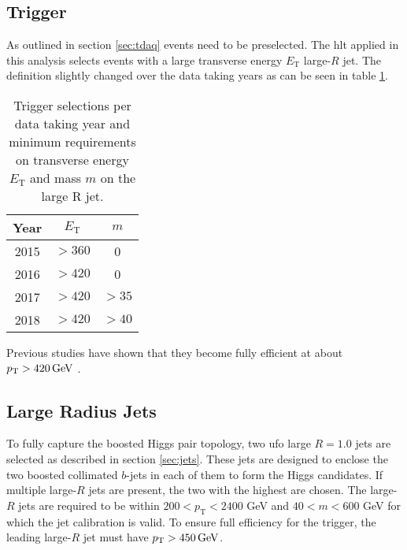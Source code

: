\subsection{Trigger}
As outlined in section \ref{sec:tdaq} events need to be preselected. The \ac{hlt} applied in this analysis selects events with a large transverse energy $E_\text{T}$ large-$R$ jet. The definition slightly changed over the data taking years as can be seen in table \ref{tab:trigger}.
\begin{table}[htbp]
    \centering
    \caption{Trigger selections per data taking year and minimum requirements on transverse energy $E_\text{T}$ and mass $m$ on the large R jet. }
    \begin{tabular}{ccc}
        \hline
        Year & $E_\text{T}$ & $m$   \\ \hline
        2015 & $>360$       & 0     \\
        2016 & $>420$       & 0     \\
        2017 & $>420$       & $>35$ \\
        2018 & $>420$       & $>40$ \\ \hline
    \end{tabular}
    \label{tab:trigger}
\end{table}
Previous studies have shown that they become fully efficient at about $p_{\text{T}}>\qty[]{420}{GeV}$ \citep{ATL-COM-PHYS-2020-083,ATL-COM-PHYS-2023-033}.

\subsection{Large Radius Jets}
To fully capture the boosted Higgs pair topology, two \ac{ufo} large $R=1.0$ jets are selected as described in section \ref{sec:jets}. These jets are designed to enclose the two boosted collimated $b$-jets in each of them to form the Higgs candidates. If multiple large-$R$ jets are present, the two with the highest \pt are chosen. The large-$R$ jets are required to be within $200<p_{\text{T}}<2400$ GeV and $40<m<600$ GeV for which the jet calibration is valid. To ensure full efficiency for the trigger, the leading large-$R$ jet must have $p_{\text{T}}>\qty[]{450}{GeV}$.

